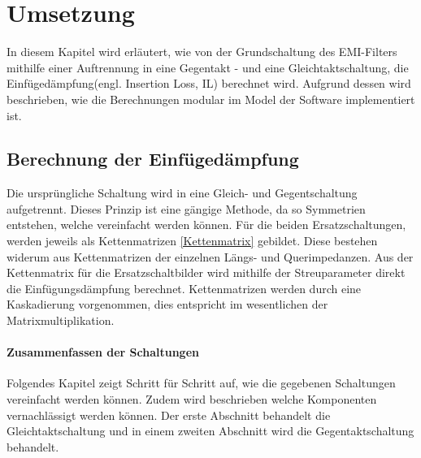 \section{Umsetzung} \label{sec:umsetzung}

In diesem Kapitel wird erläutert, wie von der Grundschaltung des EMI-Filters mithilfe einer Auftrennung in eine Gegentakt - und eine Gleichtaktschaltung, die Einfügedämpfung(engl. Insertion Loss, IL) berechnet wird. Aufgrund dessen  wird beschrieben, wie die Berechnungen modular im Model der Software implementiert ist. \\

\subsection{Berechnung der Einfügedämpfung} \label{subsec:einfugedampfung}

Die ursprüngliche Schaltung wird in eine Gleich- und Gegentschaltung aufgetrennt. Dieses Prinzip ist eine gängige Methode, da so Symmetrien entstehen, welche vereinfacht werden können. Für die beiden Ersatzschaltungen, werden jeweils als Kettenmatrizen \ref{Kettenmatrix} gebildet. Diese bestehen widerum aus Kettenmatrizen der einzelnen Längs- und Querimpedanzen. Aus der Kettenmatrix für die Ersatzschaltbilder wird mithilfe der Streuparameter direkt die Einfügungsdämpfung berechnet. Kettenmatrizen werden durch eine Kaskadierung vorgenommen, dies entspricht im wesentlichen der Matrixmultiplikation. \\


\paragraph{Zusammenfassen der Schaltungen} \label{par:zusammenfassungSchaltung}
Folgendes Kapitel zeigt Schritt für Schritt auf, wie die gegebenen Schaltungen vereinfacht werden können. Zudem wird beschrieben welche Komponenten vernachlässigt werden können. Der erste Abschnitt behandelt die Gleichtaktschaltung und in einem zweiten Abschnitt wird die Gegentaktschaltung behandelt.

